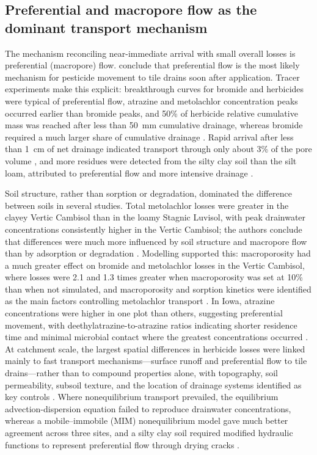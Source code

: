 \documentclass[11pt]{article}
\begin{document}
\subsection{Preferential and macropore flow as the dominant transport mechanism}
The mechanism reconciling near-immediate arrival with small overall losses is preferential (macropore) flow. \textcite{Kladivko2001} conclude that preferential flow is the most likely mechanism for pesticide movement to tile drains soon after application. Tracer experiments make this explicit: breakthrough curves for bromide and herbicides were typical of preferential flow, atrazine and metolachlor concentration peaks occurred earlier than bromide peaks, and 50\% of herbicide relative cumulative mass was reached after less than 50~mm cumulative drainage, whereas bromide required a much larger share of cumulative drainage \parencite{Fortin2002}. Rapid arrival after less than 1~cm of net drainage indicated transport through only about 3\% of the pore volume \parencite{Dousset2004}, and more residues were detected from the silty clay soil than the silt loam, attributed to preferential flow and more intensive drainage \parencite{Dousset2004}.

Soil structure, rather than sorption or degradation, dominated the difference between soils in several studies. Total metolachlor losses were greater in the clayey Vertic Cambisol than in the loamy Stagnic Luvisol, with peak drainwater concentrations consistently higher in the Vertic Cambisol; the authors conclude that differences were much more influenced by soil structure and macropore flow than by adsorption or degradation \parencite{Novak2001}. Modelling supported this: macroporosity had a much greater effect on bromide and metolachlor losses in the Vertic Cambisol, where losses were 2.1 and 1.3 times greater when macroporosity was set at 10\% than when not simulated, and macroporosity and sorption kinetics were identified as the main factors controlling metolachlor transport \parencite{Novak2003}. In Iowa, atrazine concentrations were higher in one plot than others, suggesting preferential movement, with deethylatrazine-to-atrazine ratios indicating shorter residence time and minimal microbial contact where the greatest concentrations occurred \parencite{JAYACHANDRAN1994}. At catchment scale, the largest spatial differences in herbicide losses were linked mainly to fast transport mechanisms---surface runoff and preferential flow to tile drains---rather than to compound properties alone, with topography, soil permeability, subsoil texture, and the location of drainage systems identified as key controls \parencite{Leu2004}. Where nonequilibrium transport prevailed, the equilibrium advection-dispersion equation failed to reproduce drainwater concentrations, whereas a mobile--immobile (MIM) nonequilibrium model gave much better agreement across three sites, and a silty clay soil required modified hydraulic functions to represent preferential flow through drying cracks \parencite{Boivin2006}.
\end{document}
